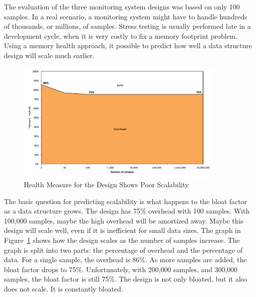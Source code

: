 The evaluation of the three monitoring system designs was based on only 100
samples. In a real scenario, a monitoring system might have to handle hundreds
of thousands, or millions, of samples. Stress testing is usually performed late
in a development cycle, when it is very costly to fix a memory footprint
problem. Using a memory health approach, it possible to predict how well a data
structure design will scale much earlier.
 
\begin{figure}
  \centering
   \includegraphics[width=0.9\textwidth]{part1/Figures/memoryhealth/scalable-health-treemap}
  \caption{Health Measure for the  Design Shows Poor Scalability}
  \label{fig:scalable-health-treemap}
\end{figure}
The basic question for predicting scalability is what happens to the bloat
factor as a data structure grows. The  design has 75\% overhead
with 100 samples. With 100,000 samples, maybe the high overhead will be
amortized away. Maybe this design will scale well, even if it is inefficient for
small data sizes. The graph in Figure~\ref{fig:scalable-health-treemap}
shows how the  design scales as the number of samples increase.
The graph is split into two parts: the percentage of overhead and the percentage
of data. For a single sample, the overhead is 86\%. As more samples are added,
the bloat factor drops to 75\%. Unfortunately, with 200,000 samples, and 300,000
samples, the bloat factor is still 75\%. The  design is not only
bloated, but it also does not scale. It is constantly bloated.


